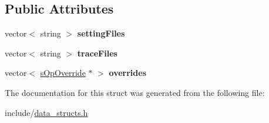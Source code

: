 \subsection*{\-Public \-Attributes}
\begin{DoxyCompactItemize}
\item 
\hypertarget{structsCmdOptions_afba8ae78df0568781a69f72476f36805}{vector$<$ string $>$ {\bfseries setting\-Files}}\label{d2/db8/structsCmdOptions_afba8ae78df0568781a69f72476f36805}

\item 
\hypertarget{structsCmdOptions_ada3acf44b12be001579ba43f6cd639bf}{vector$<$ string $>$ {\bfseries trace\-Files}}\label{d2/db8/structsCmdOptions_ada3acf44b12be001579ba43f6cd639bf}

\item 
\hypertarget{structsCmdOptions_a54e24cd92212dbee24e8a62d3802bdc8}{vector$<$ \hyperlink{structsOpOverride}{s\-Op\-Override} $\ast$ $>$ {\bfseries overrides}}\label{d2/db8/structsCmdOptions_a54e24cd92212dbee24e8a62d3802bdc8}

\end{DoxyCompactItemize}


\-The documentation for this struct was generated from the following file\-:\begin{DoxyCompactItemize}
\item 
include/\hyperlink{data__structs_8h}{data\-\_\-structs.\-h}\end{DoxyCompactItemize}
